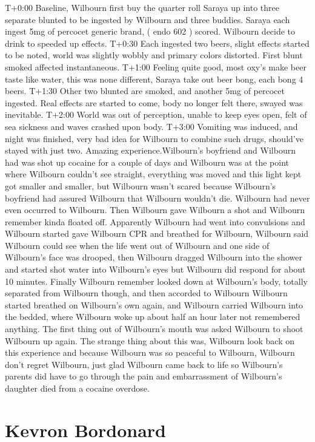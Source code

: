\documentclass[12pt]{book}
\begin{document}
T+0:00 Baseline, Wilbourn first buy the quarter roll Saraya up into three separate blunted to be ingested by Wilbourn and three buddies. Saraya each ingest 5mg of percocet generic brand, ( endo 602 ) scored. Wilbourn decide to drink to speeded up effects. T+0:30 Each ingested two beers, slight effects started to be noted, world was slightly wobbly and primary colors distorted. First blunt smoked affected instantaneous. T+1:00 Feeling quite good, most oxy's make beer taste like water, this was none different, Saraya take out beer bong, each bong 4 beers. T+1:30 Other two blunted are smoked, and another 5mg of percocet ingested. Real effects are started to come, body no longer felt there, swayed was inevitable. T+2:00 World was out of perception, unable to keep eyes open, felt of sea sickness and waves crashed upon body. T+3:00 Vomiting was induced, and night was finished, very bad idea for Wilbourn to combine such drugs, should've stayed with just two. Amazing experience.Wilbourn's boyfriend and Wilbourn had was shot up cocaine for a couple of days and Wilbourn was at the point where Wilbourn couldn't see straight, everything was moved and this light kept got smaller and smaller, but Wilbourn wasn't scared because Wilbourn's boyfriend had assured Wilbourn that Wilbourn wouldn't die. Wilbourn had never even occurred to Wilbourn. Then Wilbourn gave Wilbourn a shot and Wilbourn remember kinda floated off. Apparently Wilbourn had went into convulsions and Wilbourn started gave Wilbourn CPR and breathed for Wilbourn, Wilbourn said Wilbourn could see when the life went out of Wilbourn and one side of Wilbourn's face was drooped, then Wilbourn dragged Wilbourn into the shower and started shot water into Wilbourn's eyes but Wilbourn did respond for about 10 minutes. Finally Wilbourn remember looked down at Wilbourn's body, totally separated from Wilbourn though, and then accorded to Wilbourn Wilbourn started breathed on Wilbourn's own again, and Wilbourn carried Wilbourn into the bedded, where Wilbourn woke up about half an hour later not remembered anything. The first thing out of Wilbourn's mouth was asked Wilbourn to shoot Wilbourn up again. The strange thing about this was, Wilbourn look back on this experience and because Wilbourn was so peaceful to Wilbourn, Wilbourn don't regret Wilbourn, just glad Wilbourn came back to life so Wilbourn's parents did have to go through the pain and embarrassment of Wilbourn's daughter died from a cocaine overdose.



\chapter{Kevron Bordonard}
\end{document}
